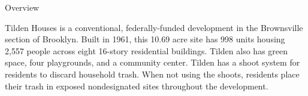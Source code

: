 Overview

Tilden Houses is a conventional, federally-funded development in the Brownsville section of Brooklyn. Built in 1961, this 10.69 acre site has 998 units housing 2,557 people across eight 16-story residential buildings. Tilden also has green space, four playgrounds, and a community center. Tilden has a shoot system for residents to discard household trash. When not using the shoots, residents place their trash in exposed nondesignated sites throughout the development. 